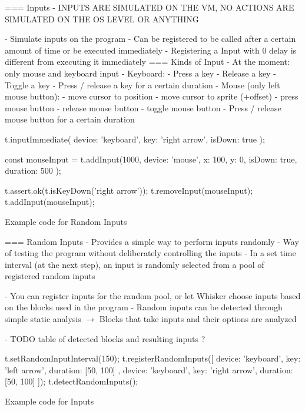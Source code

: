 === Inputs
- INPUTS ARE SIMULATED ON THE VM, NO ACTIONS ARE SIMULATED ON THE OS LEVEL OR ANYTHING

- Simulate inputs on the program
- Can be registered to be called after a certain amount of time or be executed immediately
- Registering a Input with 0 delay is different from executing it immediately
=== Kinds of Input
- At the moment: only mouse and keyboard input
- Keyboard:
    - Press a key
    - Release a key
    - Toggle a key
    - Press / release a key for a certain duration
- Mouse (only left mouse button):
    - move cursor to position
    - move cursor to sprite (+offset)
    - press mouse button
    - release mouse button
    - toggle mouse button
    - Press / release mouse button for a certain duration

\begin{listing}[ht]
    \centering
    \begin{javascriptcode}
        t.inputImmediate({
            device: 'keyboard',
            key: 'right arrow',
            isDown: true
        });

        const mouseInput = t.addInput(1000, {
            device: 'mouse',
            x: 100,
            y: 0,
            isDown: true,
            duration: 500
        });

        t.assert.ok(t.isKeyDown('right arrow'));
        t.removeInput(mouseInput);
        t.addInput(mouseInput);
    \end{javascriptcode}
    \vspace{-\bigskipamount}
    \caption{Example code for Random Inputs}
    \label{fig:example_code_for_random_inputs}
\end{listing}

=== Random Inputs
- Provides a simple way to perform inputs randomly
- Way of testing the program without deliberately controlling the inputs
- In a set time interval (at the next step), an input is randomly selected from a pool of registered random inputs

- You  can register inputs for the random pool, or let Whisker choose inputs based on the blocks used in the program
- Random inputs can be detected through simple static analysis
$\rightarrow$ Blocks that take inputs and their options are analyzed

- TODO table of detected blocks and resulting inputs ?

\begin{listing}[ht]
    \centering
    \begin{javascriptcode}
        t.setRandomInputInterval(150);
        t.registerRandomInputs([
            {
                device: 'keyboard',
                key: 'left arrow',
                duration: [50, 100]
            },
            {
                device: 'keyboard',
                key: 'right arrow',
                duration: [50, 100]
            }
        ]);
        t.detectRandomInputs();
    \end{javascriptcode}
    \vspace{-\bigskipamount}
    \caption{Example code for Inputs}
    \label{fig:example_code_for_inputs}
\end{listing}

